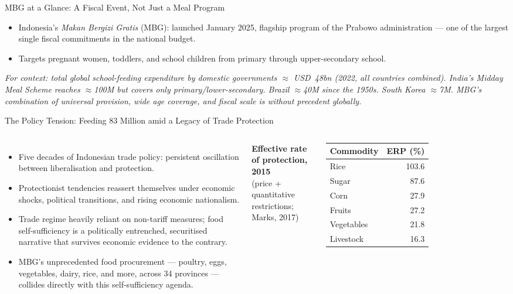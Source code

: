 \documentclass[11pt,aspectratio=169]{beamer}
\begin{document}
\begin{frame}{MBG at a Glance: A Fiscal Event, Not Just a Meal Program}
\begin{itemize}
	\item Indonesia's \textit{Makan Bergizi Gratis} (MBG): launched January 2025, flagship program of the Prabowo administration --- one of the largest single fiscal commitments in the national budget.
	\item Targets pregnant women, toddlers, and school children from primary through upper-secondary school.
\end{itemize}
\smallskip
{\tiny\textit{For context: total global school-feeding expenditure by domestic governments $\approx$ USD~48bn (2022, all countries combined). India's Midday Meal Scheme reaches $\approx$100M but covers only primary/lower-secondary. Brazil $\approx$40M since the 1950s. South Korea $\approx$7M. MBG's combination of universal provision, wide age coverage, and fiscal scale is without precedent globally.}}
\end{frame}

\begin{frame}{The Policy Tension: Feeding 83 Million amid a Legacy of Trade Protection}
\footnotesize
\begin{columns}[T,onlytextwidth]
	\begin{itemize}\setlength\itemsep{6pt}
		\item Five decades of Indonesian trade policy: persistent oscillation between liberalisation and protection.
		\item Protectionist tendencies reassert themselves under economic shocks, political transitions, and rising economic nationalism.
		\item Trade regime heavily reliant on non-tariff measures; food self-sufficiency is a politically entrenched, securitised narrative that survives economic evidence to the contrary.
		\item MBG's unprecedented food procurement --- poultry, eggs, vegetables, dairy, rice, and more, across 34 provinces --- collides directly with this self-sufficiency agenda.
	\end{itemize}
	\centering
	{\scriptsize\textcolor{lubrown}{\textbf{Effective rate of protection, 2015}}}\\
	{\tiny (price + quantitative restrictions; Marks, 2017)}
	\vspace{6pt}

	\begin{tabular}{lr}
		\toprule
		\textbf{Commodity} & \textbf{ERP (\%)} \\
		\midrule
		Rice       & 103.6 \\
		Sugar      &  87.6 \\
		Corn       &  27.9 \\
		Fruits     &  27.2 \\
		Vegetables &  21.8 \\
		Livestock  &  16.3 \\
		\bottomrule
	\end{tabular}
\end{columns}
\end{frame}
\end{document}
